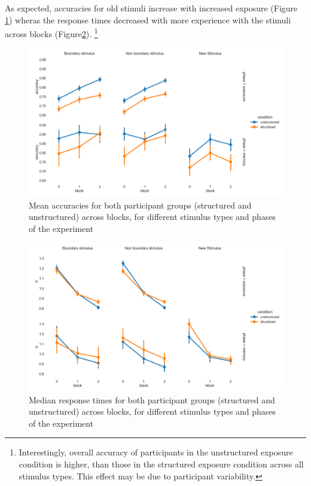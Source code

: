As expected, accuracies for old stimuli increase with increased exposure (Figure \ref{fig:exp2-accuracies}) wheras the response times decreased with more experience with the stimuli across blocks (Figure\ref{fig:exp2-rts}). \footnote{Interestingly, overall accuracy of participants in the unstructured exposure condition is higher, than those in the structured exposure condition across all stimulus types. This effect may be due to participant variability.} 

\begin{figure}
    \centering
    \includegraphics[width = \textwidth]{chapter_notebooks/chapter_3/figures/exposure_recog_accuracy_allphases.png}
    \caption{Mean accuracies for both participant groups (structured and unstructured) across blocks, for different stimulus types and phases of the experiment}
    \label{fig:exp2-accuracies}
\end{figure}


\begin{figure}
    \centering
    \includegraphics[width = \textwidth]{chapter_notebooks/chapter_3/figures/exposure_recog_rt_allphases.png}
    \caption{Median response times for both participant groups (structured and unstructured) across blocks, for different stimulus types and phases of the experiment}
    \label{fig:exp2-rts}
\end{figure}

